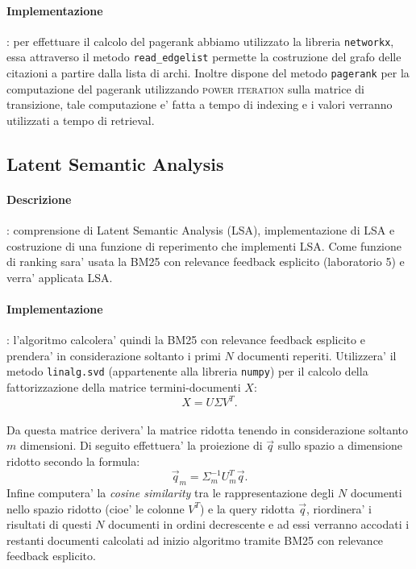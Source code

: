 \paragraph{\textbf{Implementazione}}: per effettuare il calcolo del pagerank abbiamo utilizzato la libreria \texttt{networkx}, essa attraverso il metodo \texttt{read\_edgelist} permette la costruzione del grafo delle citazioni a partire dalla lista di archi. Inoltre dispone del metodo \texttt{pagerank} per la computazione del pagerank utilizzando \textsc{power iteration} sulla matrice di transizione, tale computazione e' fatta a tempo di indexing e i valori verranno utilizzati a tempo di retrieval.

\subsection{Latent Semantic Analysis}
\label{sec:lsa}

\paragraph{\textbf{Descrizione}}: comprensione di Latent Semantic Analysis (LSA), implementazione di LSA e costruzione di una funzione di reperimento che implementi LSA.
Come funzione di ranking sara' usata la BM25 con relevance feedback esplicito (laboratorio 5) e verra' applicata LSA. 


\paragraph{\textbf{Implementazione}}: l'algoritmo calcolera' quindi la BM25 con relevance feedback esplicito e prendera' in considerazione soltanto i primi $N$ documenti reperiti. Utilizzera' il metodo \texttt{linalg.svd} (appartenente alla libreria \texttt{numpy}) per il calcolo della fattorizzazione della matrice termini-documenti $X$: 
\[ X = U \Sigma V^{T}. \]\\
Da questa matrice derivera' la matrice ridotta tenendo in considerazione soltanto $m$ dimensioni. Di seguito effettuera' la proiezione di $\vec{q}$ sullo spazio a dimensione ridotto secondo la formula: 
\[ \vec{q}_m = \Sigma^{-1}_m U^{T}_m \vec{q}. \]
Infine computera' la \textit{cosine similarity} tra le rappresentazione degli $N$ documenti nello spazio ridotto (cioe' le colonne $V^{T}$) e la query ridotta $\vec{q}$, riordinera' i risultati di questi $N$ documenti in ordini decrescente e ad essi verranno accodati i restanti documenti calcolati ad inizio algoritmo tramite BM25 con relevance feedback esplicito.


